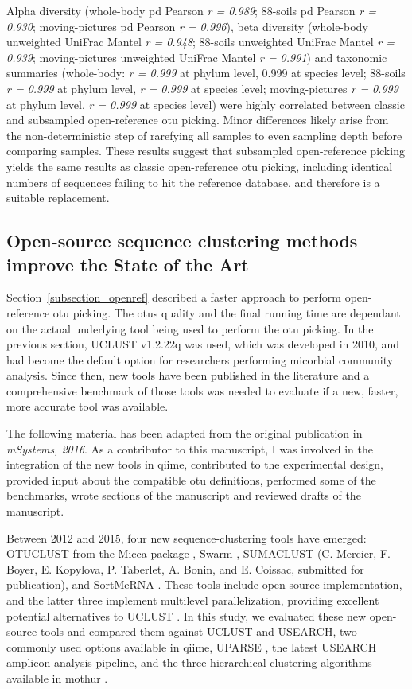 Alpha diversity (whole-body \gls{pd} Pearson \emph{r = 0.989}; 88-soils \gls{pd}
Pearson \emph{r = 0.930}; moving-pictures \gls{pd} Pearson \emph{r = 0.996}),
beta diversity (whole-body unweighted UniFrac Mantel \emph{r = 0.948};
88-soils unweighted UniFrac Mantel \emph{r = 0.939}; moving-pictures
unweighted UniFrac Mantel \emph{r = 0.991}) and taxonomic summaries (whole-body:
\emph{r = 0.999} at phylum level, 0.999 at species level; 88-soils \emph{r = 0.999}
at phylum level, \emph{r = 0.999} at species level; moving-pictures \emph{r = 0.999}
at phylum level, \emph{r = 0.999} at species level) were highly correlated between
classic and subsampled open-reference \gls{otu} picking. Minor differences likely
arise from the non-deterministic step of rarefying all samples to even sampling
depth before comparing samples. These results suggest that subsampled open-reference
picking yields the same results as classic open-reference \gls{otu} picking,
including identical numbers of sequences failing to hit the reference database,
and therefore is a suitable replacement.

\subsection{Open-source sequence clustering methods improve the State of the Art}\label{subsection_soa}

Section~\ref{subsection_openref} described a faster approach to perform open-reference
\gls{otu} picking. The \gls{otu}s quality and the final running time are dependant
on the actual underlying tool being used to perform the \gls{otu} picking. In the
previous section, UCLUST v1.2.22q \cite{Edgar2010} was used, which was
developed in 2010, and had become the default option for researchers performing
micorbial community analysis. Since then, new tools have been published in the
literature and a comprehensive benchmark of those tools was needed to evaluate if
a new, faster, more accurate tool was available.

The following material has been adapted from the original publication in
\textsl{mSystems, 2016}. As a contributor to this manuscript, I was involved in
the integration of the new tools in \gls{qiime}, contributed to the experimental
design, provided input about the compatible \gls{otu} definitions,
performed some of the benchmarks, wrote sections of the manuscript and
reviewed drafts of the manuscript.

Between 2012 and 2015, four new sequence-clustering tools have emerged: OTUCLUST
from the Micca package \cite{Albanese2015}, Swarm \cite{Mahe2014, Mahe2015},
SUMACLUST (C. Mercier, F. Boyer, E. Kopylova, P. Taberlet, A. Bonin, and E. Coissac,
submitted for publication), and SortMeRNA \cite{Kopylova2012}. These tools
include open-source implementation, and the latter three implement multilevel
parallelization, providing excellent potential alternatives to UCLUST \cite{Edgar2010}.
In this study, we evaluated these new open-source tools and compared them against
UCLUST and USEARCH, two commonly used options available in \gls{qiime}, UPARSE
\cite{Edgar2013}, the latest USEARCH amplicon analysis pipeline, and the three
hierarchical clustering algorithms available in mothur \cite{Schloss2009}.

